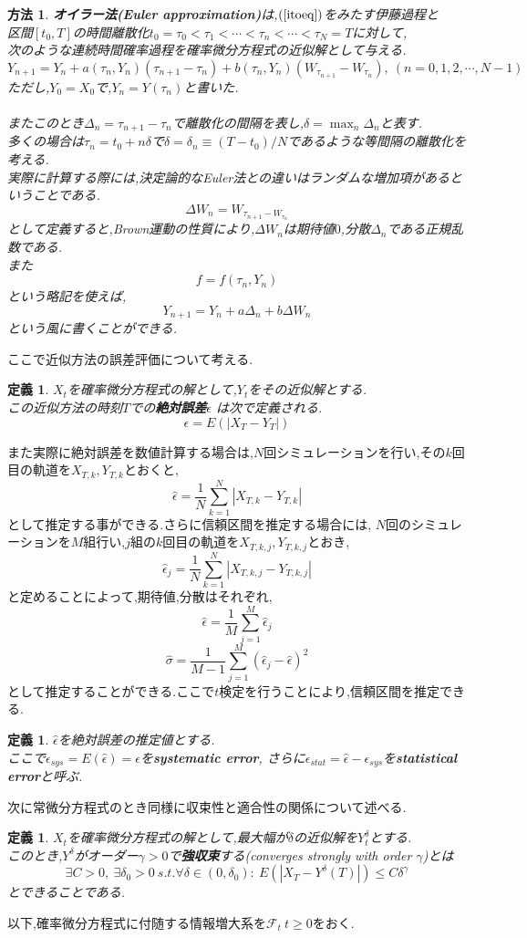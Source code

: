\documentclass[a4paper,dvipdfmx]{jreport}
\numberwithin{equation}{section}
\newtheorem{Def}     [Thm]{定義}
\newtheorem{Method}[Thm]{方法}
\renewenvironment{leftbar}{%
  \def\FrameCommand{\vrule width 1pt \hspace{10pt}}%
  \MakeFramed {\advance\hsize-\width \FrameRestore}}%
 {\endMakeFramed}
\def\F{\mathcal F}
\def\method{\begin{leftbar}\begin{Method}}
\def\methodx{\end{Method}\end{leftbar}}
\def\defb{\begin{leftbar}\begin{Def}}
\def\defx{\end{Def}\end{leftbar}}
\def\eq{\begin{equation}}
\def\eqx{\end{equation}}
\begin{document}
\method
{\bf オイラー法(Euler approximation)}は,$(\ref{itoeq})$をみたす伊藤過程と\\
区間$[t_0,T]$の時間離散化$t_0 = \tau_0 < \tau_1 < \cdots < \tau_n < \cdots < \tau_N = T$に対して,\\
次のような連続時間確率過程を確率微分方程式の近似解として与える.
\eq
\label{eq913}
Y_{n+1} = Y_n + a(\tau_n , Y_n)(\tau_{n+1} -\tau_n) + b(\tau_n,Y_n) (W_{\tau_{n+1}} - W_{\tau_n}),
\ (n = 0,1,2,\cdots,N-1)
\eqx
ただし,$Y_0 = X_0$で,$Y_n = Y(\tau_n)$と書いた.\\
\\
またこのとき$\Delta_n = \tau_{n+1} -\tau_n $で離散化の間隔を表し,$\delta = \max_{n} \Delta_n$と表す.\\
多くの場合は$\tau_n = t_0 + n\delta$で$\delta = \delta_n  \equiv (T-t_0)/N$であるような等間隔の離散化を考える.\\
実際に計算する際には,決定論的なEuler法との違いはランダムな増加項があるということである.\\
\[
\Delta W_n = W_{\tau_{n+1} -W_{\tau_n}}
\]
として定義すると,Brown運動の性質により,$\Delta W_n$は期待値$0$,分散$\Delta_n$である正規乱数である.\\
また
\[
f = f(\tau_n,Y_n)
\]
という略記を使えば,
\[
Y_{n+1} = Y_n + a \Delta_n + b \Delta W_n
\]
という風に書くことができる.

\methodx
ここで近似方法の誤差評価について考える.
\defb
$X_t$を確率微分方程式の解として,$Y_t$をその近似解とする.\\
この近似方法の時刻$T$での{\bf 絶対誤差}$\epsilon$ は次で定義される.
\[
\epsilon = E ( | X_T - Y_T | )
\]
\defx

また実際に絶対誤差を数値計算する場合は,$N$回シミュレーションを行い,その$k$回目の軌道を$X_{T,k},Y_{T,k}$とおくと,
\[
\hat{\epsilon} = \frac{1}{N} \sum_{k=1}^N | X_{T,k} - Y_{T,k} |
\]
として推定する事ができる.さらに信頼区間を推定する場合には,
$N$回のシミュレーションを$M$組行い,$j$組の$k$回目の軌道を$X_{T,k,j},Y_{T,k,j}$とおき,
\[
\hat{\epsilon}_j = \frac{1}{N} \sum_{k=1}^N | X_{T,k,j} - Y_{T,k,j} |
\]
と定めることによって,期待値,分散はそれぞれ,
\[
\hat{\epsilon} = \frac{1}{M} \sum_{j=1}^M \hat{\epsilon}_j 
\]
\[
\hat{\sigma} = \frac{1}{M-1} \sum_{j=1}^M (\hat{\epsilon}_j  - \hat{\epsilon})^2
\]
として推定することができる.ここで$t$検定を行うことにより,信頼区間を推定できる.
\defb
$\hat{\epsilon}$を絶対誤差の推定値とする.\\
ここで$\epsilon_{sys} = E(\hat{\epsilon}) = \epsilon$を{\bf systematic error},
さらに$\epsilon_{stat} = \hat{\epsilon} - \epsilon_{sys}$を{\bf statistical error}と呼ぶ.
\defx
次に常微分方程式のとき同様に収束性と適合性の関係について述べる.
\defb
$X_t$を確率微分方程式の解として,最大幅が$\delta$の近似解を$Y_t^\delta$とする.\\
このとき,$Y^\delta$がオーダー$\gamma > 0$で{\bf 強収束}する(converges strongly with order $\gamma$)とは
\[
\exists C > 0 ,\ \exists \delta_0 > 0 \ s.t.  \forall \delta \in (0,\delta_0) : \ E(|X_T - Y^\delta(T) | ) \le C\delta^\gamma
\]
とできることである.
\defx
以下,確率微分方程式に付随する情報増大系を$\F_t \ t\ge 0$をおく.
\end{document}
